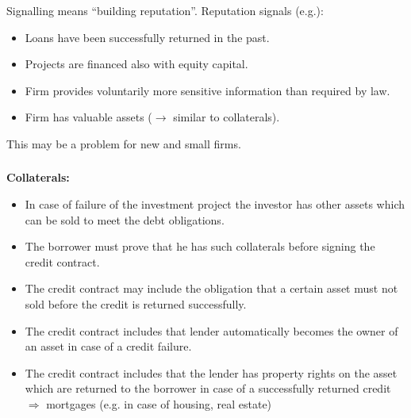 \documentclass[11pt]{beamer}
\begin{document}
\begin{frame}
\frametitle{\insertsection}

Signalling means ``building reputation''. Reputation signals (e.g.):

\begin{itemize}
\item Loans have been successfully returned in the past.
\item Projects are financed also with equity capital.
\item Firm provides voluntarily more sensitive information than required by law.
\item Firm has valuable assets ($\rightarrow$ similar to collaterals).
\end{itemize}
\par\bigskip

This may be a problem for new and small firms.
\end{frame}


\begin{frame}
\frametitle{\insertsection}

\textbf{Collaterals:}

\begin{itemize}
\item In case of failure of the investment project the investor has other assets which can be sold to meet the debt obligations.

\item The borrower must prove that he has such collaterals before signing the credit contract.

\item The credit contract may include the obligation that a certain asset must not sold before the credit is returned successfully.

\item The credit contract includes that lender automatically becomes the owner of an asset in case of a credit failure.

\item The credit contract includes that the lender has property rights on the asset which are returned to the borrower in case of a successfully returned credit $\Rightarrow$ mortgages (e.g. in case of housing, real estate)
\end{itemize}
\end{frame}

\end{document}
